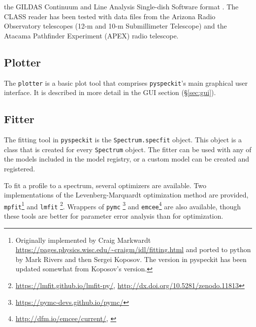 \documentclass[twocolumn,linenumbers]{aastex63}
\newcommand{\pyspeckit}{\texttt{pyspeckit}\xspace}
\begin{document}
\begin{itemize}
        the GILDAS Continuum and Line Analysis Single-dish Software format
        \citep[CLASS;][]{Gildas-Team2013a}.  
        The CLASS reader has been tested with data files from
        the Arizona Radio Observatory telescopes (12-m and 10-m Submillimeter
        Telescope) and the Atacama Pathfinder Experiment (APEX) radio
        telescope.
\end{itemize}

\subsection{Plotter}
The \texttt{plotter} is a basic plot tool that comprises \pyspeckit's main
graphical user interface.
It is described in more detail in the  GUI section (\S \ref{sec:gui}).


\subsection{Fitter}
\label{sec:fitters}
The fitting tool in \pyspeckit is the \texttt{Spectrum.specfit} object.
This object is a class that is created for every \texttt{Spectrum} object.
The fitter can be used with any of the models included in the model
registry, or a custom model can be created and registered.

To fit a profile to a spectrum, several optimizers are available.  Two
implementations of the Levenberg-Marquardt optimization method
\citep{Levenberg1944a,Marquardt1963a} are provided,
\texttt{mpfit}\footnote{Originally implemented by Craig Markwardt \citet{Markwardt2009}
\url{https://pages.physics.wisc.edu/~craigm/idl/fitting.html} and ported to python
by Mark Rivers and then Sergei Koposov.  The version in pyspeckit has been
updated somewhat from Koposov's version.} and
\texttt{lmfit} \citep{Newville2014}\footnote{\url{https://lmfit.github.io/lmfit-py/},
\url{http://dx.doi.org/10.5281/zenodo.11813}}.  Wrappers of
\texttt{pymc} \citep{Salvatier2016}\footnote{\url{https://pymc-devs.github.io/pymc/}} and
\texttt{emcee}\footnote{\url{http://dfm.io/emcee/current/},
\citet{Foreman-Mackey2013a}} are also available, though these tools are better
for parameter error analysis than for optimization.
\end{document}
